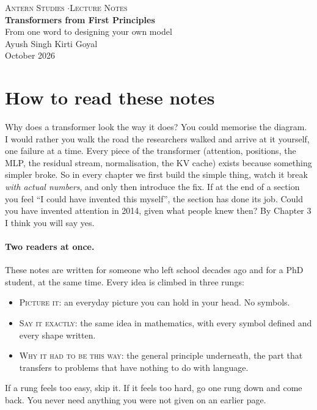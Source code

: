 \thispagestyle{empty}
\begin{center}
{\small\textsc{Antern Studies \quad$\cdot$\quad Lecture Notes}}\\[14pt]
{\LARGE\bfseries Transformers from First Principles}\\[8pt]
{\large From one word to designing your own model}\\[12pt]
Ayush Singh \quad\textperiodcentered\quad Kirti Goyal\\[2pt]
{\small October 2026}
\end{center}
\vspace{4pt}

\section*{How to read these notes}

Why does a transformer look the way it does? You could memorise the diagram. I would rather you walk the road
the researchers walked and arrive at it yourself, one failure at a time. Every piece of the transformer
(attention, positions, the MLP, the residual stream, normalisation, the KV cache) exists because something
simpler broke. So in every chapter we first build the simple thing, watch it break \emph{with actual numbers},
and only then introduce the fix. If at the end of a section you feel ``I could have invented this myself'',
the section has done its job. Could you have invented attention in 2014, given what people knew then?
By Chapter 3 I think you will say yes.

\paragraph{Two readers at once.} These notes are written for someone who left school decades ago and for a
PhD student, at the same time. Every idea is climbed in three rungs:
\begin{itemize}
\item \textsc{Picture it}: an everyday picture you can hold in your head. No symbols.
\item \textsc{Say it exactly}: the same idea in mathematics, with every symbol defined and every shape written.
\item \textsc{Why it had to be this way}: the general principle underneath, the part that transfers to
problems that have nothing to do with language.
\end{itemize}
If a rung feels too easy, skip it. If it feels too hard, go one rung down and come back. You never need
anything you were not given on an earlier page.

